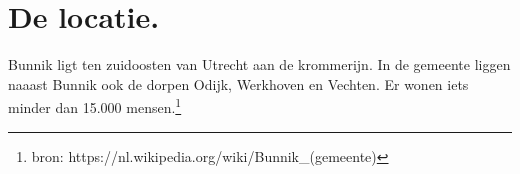 \section{De locatie.}
Bunnik ligt ten zuidoosten van Utrecht aan de krommerijn. 
In de gemeente liggen naaast Bunnik ook de dorpen Odijk, Werkhoven en Vechten. 
Er wonen iets minder dan 15.000 mensen.\footnote{bron: https://nl.wikipedia.org/wiki/Bunnik_(gemeente)}

